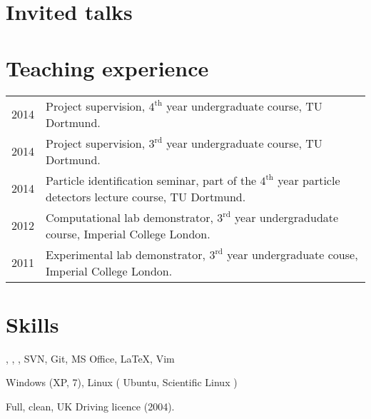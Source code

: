 \documentclass[10pt]{article}
\renewenvironment{compactitem}{
  \begin{list}{}{
    \setlength{\leftmargin}{1.5em}
  }
}{
  \end{list}
}
\begin{document}
\section*{Invited talks} 
\begin{compactitem}
\item {}
\item {}
\item {}
\item {}
\item {}
\item {}
\end{compactitem}

\section*{Teaching experience}
\begin{tabular}{ll}
    2014 & Project supervision, $4^{\text{th}}$ year undergraduate course, TU Dortmund. \\
    2014 & Project supervision, $3^{\text{rd}}$ year undergraduate course, TU Dortmund. \\
    2014 & Particle identification seminar, part of the $4^{\text{th}}$ year particle detectors lecture course, TU Dortmund. \\
    2012 & Computational lab demonstrator, $3^{\text{rd}}$ year undergradudate course, Imperial College London. \\
    2011 & Experimental lab demonstrator, $3^{\text{rd}}$ year undergraduate couse, Imperial College London.
\end{tabular}

\section*{Skills}
\begin{compactitem}
    \item \cpp, \python, \fortran, SVN, Git, MS Office, \LaTeX, Vim
    \item Windows (XP, 7), Linux ( Ubuntu, Scientific Linux )
    \item Full, clean, UK Driving licence (2004).
\end{compactitem}

\end{document}
